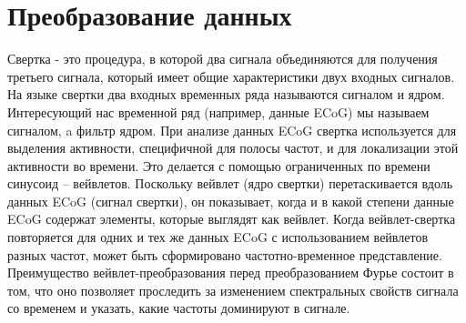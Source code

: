 \section{Преобразование данных}
Свертка - это процедура, в которой два сигнала объединяются для получения третьего сигнала, который имеет общие характеристики двух входных сигналов. 
На языке свертки два входных временных ряда называются сигналом и ядром.
Интересующий нас временной ряд (например, данные ECoG) мы называем сигналом, a фильтр ядром.
При анализе данных ECoG свертка используется для выделения активности, специфичной для полосы частот, и для локализации этой активности во времени. Это делается с помощью ограниченных по времени синусоид – вейвлетов. Поскольку вейвлет (ядро свертки) перетаскивается вдоль данных ECoG (сигнал свертки), он показывает, когда и в какой степени данные ECoG содержат элементы, которые выглядят как вейвлет. Когда вейвлет-свертка повторяется для одних и тех же данных ECoG с использованием вейвлетов разных частот, может быть сформировано частотно-временное представление. 
Преимущество вейвлет-преобразования перед преобразованием Фурье состоит в том, что оно позволяет проследить за изменением спектральных свойств сигнала со временем и
указать, какие частоты доминируют в сигнале.

